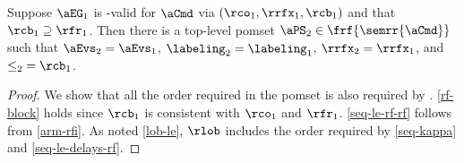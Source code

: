 
\begin{theorem}
  \label{thm:ec}
  Suppose $\aEG_1$ %
  is \EC-valid for $\aCmd$ via $({\rco_1}, {\rrfx_1}, {\rcb_1})$ and that
  ${\rcb_1}\supseteq{\rfr_1}$.  Then there is a top-level pomset
  $\aPS_2\in\frf{\semrr{\aCmd}}$ such that $\aEvs_2=\aEvs_1$,
  $\labeling_2=\labeling_1$, ${\rrfx_2}={\rrfx_1}$, and ${\le_2}={\rcb_1}$.

  \vspace{-.5\baselineskip}
  \begin{proof}
    We show that all the order required in the pomset is also required by
    \armeight{}.  \ref{rf-block} holds since ${\rcb_1}$ is consistent with
    ${\rco_1}$ and ${\rfr_1}$.  \ref{seq-le-rf-rf} follows from \ref{arm-rfi}.
    As noted \ref{lob-le}, $\rlob$ includes the order required by
    \ref{seq-kappa} and \ref{seq-le-delays-rf}.  
  \end{proof}
\end{theorem}

